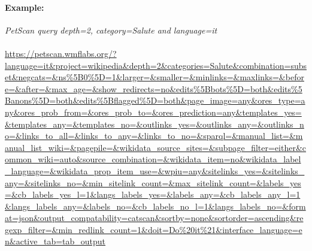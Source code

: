 \paragraph{Example:}
\textit{PetScan query \textnormal{depth=}2, \textnormal{category=}Salute and \textnormal{language=}it} \\ \\
\url{https://petscan.wmflabs.org/?language=it\&project=wikipedia\&depth=2\&categories=Salute\&combination=subset\&negcats=\&ns\%5B0\%5D=1\&larger=\&smaller=\&minlinks=\&maxlinks=\&before=\&after=\&max\_age=\&show\_redirects=no\&edits\%5Bbots\%5D=both\&edits\%5Banons\%5D=both\&edits\%5Bflagged\%5D=both\&page\_image=any\&ores\_type=any\&ores\_prob\_from=\&ores\_prob\_to=\&ores\_prediction=any\&templates\_yes=\&templates\_any=\&templates\_no=\&outlinks\_yes=\&outlinks\_any=\&outlinks\_no=\&links\_to\_all=\&links\_to\_any=\&links\_to\_no=\&sparql=\&manual\_list=\&manual\_list\_wiki=\&pagepile=\&wikidata\_source\_sites=\&subpage\_filter=either\&common\_wiki=auto\&source\_combination=\&wikidata\_item=no\&wikidata\_label\_language=\&wikidata\_prop\_item\_use=\&wpiu=any\&sitelinks\_yes=\&sitelinks\_any=\&sitelinks\_no=\&min\_sitelink\_count=\&max\_sitelink\_count=\&labels\_yes=\&cb\_labels\_yes\_l=1\&langs\_labels\_yes=\&labels\_any=\&cb\_labels\_any\_l=1\&langs\_labels\_any=\&labels\_no=\&cb\_labels\_no\_l=1\&langs\_labels\_no=\&format=json\&output\_compatability=catscan\&sortby=none\&sortorder=ascending\&regexp\_filter=\&min\_redlink\_count=1\&doit=Do\%20it\%21\&interface\_language=en\&active\_tab=tab\_output}

